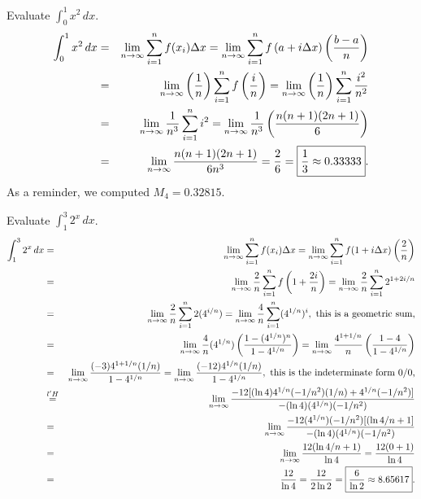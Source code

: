 \documentclass{book}
\newcommand{\dx}{\,dx}
\newcommand{\dint}{\displaystyle \int}
\begin{document}
\begin{Exam}  Evaluate $\dint_0^1 x^2\dx$.\\
\begin{eqnarray*}
\int_0^1 x^2\dx &=& \lim_{n\to \infty}\sum_{i=1}^n f(x_i)\Delta x =  \lim_{n\to \infty}\sum_{i=1}^n f\left(a+i\Delta x\right)\left(\dfrac{b-a}{n}\right)\\ 
&=&  \lim_{n\to \infty}\left(\dfrac{1}{n}\right)\sum_{i=1}^n f\left(\dfrac{i}{n}\right) = \lim_{n\to \infty}\left(\dfrac{1}{n}\right)\sum_{i=1}^n \dfrac{i^2}{n^2}\\ 
&=& \lim_{n\to \infty} \dfrac{1}{n^3}\sum_{i=1}^n i^2 = \lim_{n\to \infty} \dfrac{1}{n^3}\left(\dfrac{n(n+1)(2n+1)}{6}\right)\\
&=& \lim_{n\to \infty} \dfrac{n(n+1)(2n+1)}{6n^3} = \dfrac{2}{6} = \fbox{$\dfrac{1}{3} \approx 0.33333$}. 
\end{eqnarray*}
As a reminder, we computed $M_4 = 0.32815$.
\end{Exam}\vs

\begin{Exam} Evaluate $\dint_1^3 2^x\dx$.
\begin{eqnarray*}
\int_1^3 2^x\dx &=& \lim_{n\to \infty} \sum_{i=1}^n f(x_i)\Delta x = \lim_{n\to \infty} \sum_{i=1}^n f(1+i\Delta x)\left(\dfrac{2}{n}\right)\\
&=& \lim_{n\to \infty} \dfrac{2}{n}\sum_{i=1}^n f\left(1+ \dfrac{2i}{n}\right) = \lim_{n\to \infty} \dfrac{2}{n}\sum_{i=1}^n 2^{1+2i/n}\\
&=& \lim_{n\to \infty} \dfrac{2}{n}\sum_{i=1}^n 2(4^{i/n}) = \lim_{n\to \infty} \dfrac{4}{n}\sum_{i=1}^n (4^{1/n})^i,\ \text{this is a geometric sum,}\\
&=& \lim_{n\to \infty} \dfrac{4}{n}(4^{1/n})\left(\dfrac{1-(4^{1/n})^n}{1-4^{1/n}}\right) = \lim_{n\to \infty} \dfrac{4^{1+1/n}}{n}\left(\dfrac{1-4}{1-4^{1/n}}\right)\\
&=&  \lim_{n\to \infty}\dfrac{(-3)4^{1+1/n}(1/n)}{1-4^{1/n}} = \lim_{n\to \infty}\dfrac{(-12)4^{1/n}(1/n)}{1-4^{1/n}},\ \text{this is the indeterminate form $0/0$,}\\
&\overset{l'H}{=}& \lim_{n\to \infty} \dfrac{-12[(\ln 4)4^{1/n}(-1/n^2)(1/n) + 4^{1/n}(-1/n^2)]}{-(\ln 4)(4^{1/n})(-1/n^2)}\\ &=& \lim_{n\to \infty} \dfrac{-12(4^{1/n})(-1/n^2)[(\ln 4/n + 1]}{-(\ln 4)(4^{1/n})(-1/n^2)}\\
&=& \lim_{n\to \infty} \dfrac{12(\ln 4/n + 1)}{\ln 4} = \dfrac{12(0+1)}{\ln 4}\\
& =& \dfrac{12}{\ln 4} = \dfrac{12}{2\ln 2} = \fbox{$\dfrac{6}{\ln 2} \approx 8.65617$}. 
\end{eqnarray*}
\end{Exam}\vs
\end{document}
